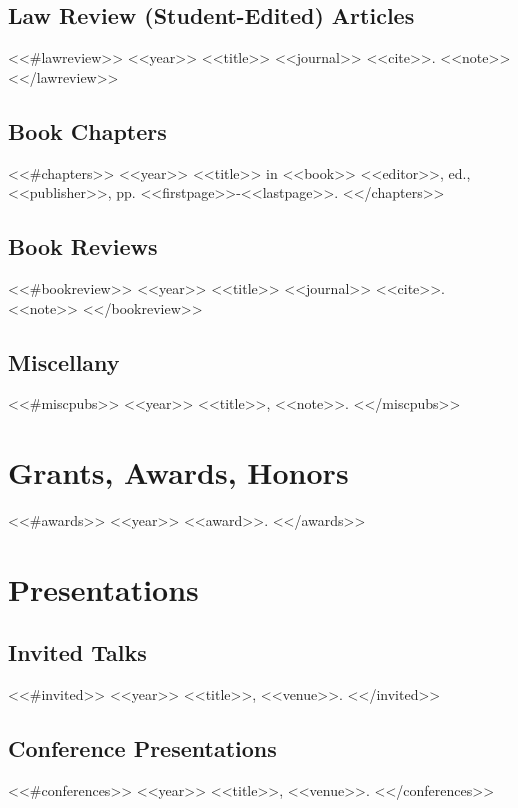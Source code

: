 \documentclass[letterpaper]{moderncv}
\begin{document}
\subsection{Law Review (Student-Edited) Articles}
<<#lawreview>>
\cventry
{<<year>>}
{<<title>>}
{}
{<<journal>>}
{}
{<<cite>>. <<note>>}
\vspace{1mm}
<</lawreview>>
\vspace{1mm}
\subsection{Book Chapters}
<<#chapters>>
\cventry
{<<year>>}
{<<title>>}
{}
{in <<book>>}
{}
{<<editor>>, ed., <<publisher>>, pp. <<firstpage>>-<<lastpage>>.}
\vspace{1mm}
<</chapters>>
\vspace{1mm}

\subsection{Book Reviews}
<<#bookreview>>
\cventry
{<<year>>}
{<<title>>}
{}
{<<journal>>}
{}
{<<cite>>. <<note>>}
\vspace{1mm}
<</bookreview>>
\vspace{1mm}

\subsection{Miscellany}
<<#miscpubs>>
\cvitem
{<<year>>}
{<<title>>, <<note>>.}
\vspace{1mm}
<</miscpubs>>


\section{Grants, Awards, Honors}
<<#awards>>
\cvitem
{<<year>>}
{<<award>>.}
\vspace{1mm}
<</awards>>


\section{Presentations}
\subsection{Invited Talks}
<<#invited>>
\cvitem
{<<year>>}
{<<title>>, <<venue>>.}
\vspace{1mm}
<</invited>>
\subsection{Conference Presentations}
<<#conferences>>
\cvitem
{<<year>>}
{<<title>>, <<venue>>.}
\vspace{1mm}
<</conferences>>
\end{document}
